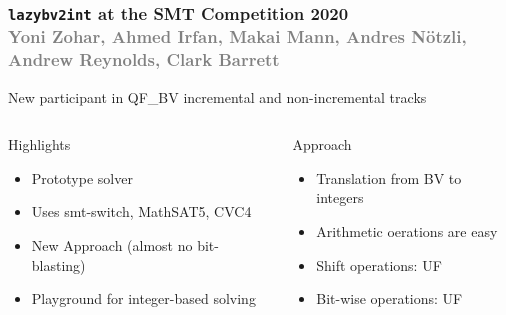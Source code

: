 \documentclass[t,aspectratio=43,9pt,bookmarks=false,dvipsnames,table]{beamer}
\newcommand{\lazybvtoint}{\texttt{lazybv2int}\xspace}
\newcommand{\qfbv}{QF\_BV\xspace}
\newcommand{\msat}{MathSAT5\xspace}
\newcommand{\cvcfour}{CVC4\xspace}
\newcommand{\smtswitch}{smt-switch\xspace}
\begin{document}
\newcommand{\gray}[1]{\textcolor{gray}{#1}}

\begin{frame}[t]
  \frametitle{\lazybvtoint at the SMT Competition 2020\\
    \footnotesize\gray{
      Yoni Zohar,
      Ahmed Irfan,
      Makai Mann,
      Andres N\"otzli,
      Andrew Reynolds,
      Clark Barrett
}}

  \small

 \begin{center}
New participant in \qfbv incremental and non-incremental tracks
\end{center}

  \begin{block}{}
  \begin{columns}
  \begin{alertblock}{Highlights}
  \begin{itemize}
  \item Prototype solver
    \item Uses \smtswitch, \msat, \cvcfour
    \item New Approach (almost no bit-blasting)
    \item Playground for integer-based solving
  \end{itemize}
  \end{alertblock}
  \begin{alertblock}{Approach}
      \begin{itemize}
  \item Translation from BV to integers
        \item Arithmetic oerations are easy
        \item Shift operations: UF 
        \item Bit-wise operations: UF
      \end{itemize}
  \end{alertblock}
  \end{columns}
  \end{block}

\vspace{-1em}
  

\end{frame}
\end{document}
